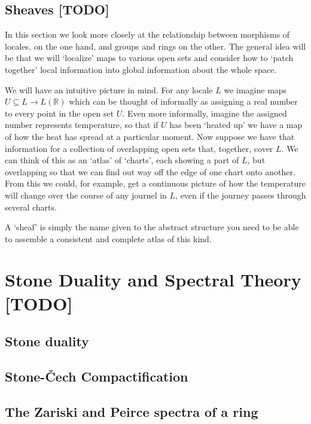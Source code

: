 \documentclass[oneside,english]{amsbook}
\numberwithin{section}{chapter}
\theoremstyle{plain}
\theoremstyle{definition}
\providecommand{\Cech}{\v{C}ech }
\begin{document}
\section{Sheaves [TODO]}

In this section we look more closely at the relationship between morphisms of locales, on the one hand, and groups and rings on the other. The general idea will be that we will `localize' maps to various open sets and consider how to `patch together' local information into global information about the whole space.

We will have an intuitive picture in mind. For any locale $L$ we imagine maps $U\subseteq L\to L(\mathbb{R})$ which can be thought of informally as assigning a real number to every point in the open set $U$. Even more informally, imagine the assigned number represents temperature, so that if $U$ has been `heated up' we have a map of how the heat has spread at a particular moment. Now suppose we have that information for a collection of overlapping open sets that, together, cover $L$. We can think of this as an `atlas' of `charts', each showing a part of $L$, but overlapping so that we can find out way off the edge of one chart onto another. From this we could, for example, get a continuous picture of how the temperature will change over the course of any journel in $L$, even if the journey passes through several charts.

A `sheaf' is simply the name given to the abstract structure you need to be able to assemble a consistent and complete atlas of this kind.







\chapter{Stone Duality and Spectral Theory [TODO]}

\section{Stone duality}
\section{Stone-\Cech Compactification}
\section{The Zariski and Peirce spectra of a ring}
\end{document}
